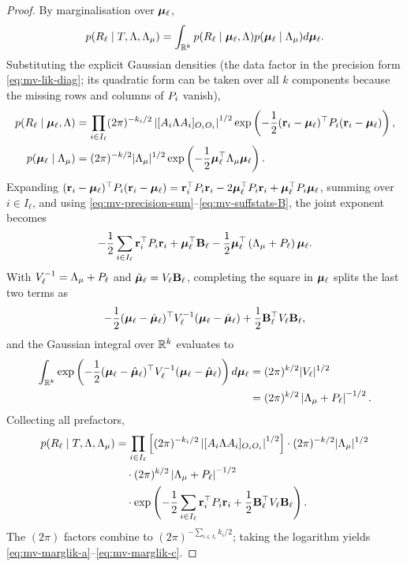 \begin{proof}
	By marginalisation over $\bm{\mu}_\ell$,
	\begin{equation}
		p(R_\ell \mid T, \Lambda, \Lambda_{\mu})
		= \int_{\mathbb{R}^k} p(R_\ell \mid \bm{\mu}_\ell, \Lambda)
		p(\bm{\mu}_\ell \mid \Lambda_{\mu})  d\bm{\mu}_\ell.
	\end{equation}
	Substituting the explicit Gaussian densities (the data factor in the
	precision form \eqref{eq:mv-lik-diag}; its quadratic form can be taken
	over all $k$ components because the missing rows and columns of $P_i$
	vanish),
	\begin{align}
		p(R_\ell \mid \bm{\mu}_\ell, \Lambda)
		 & = \prod_{i \in I_\ell}(2\pi)^{-k_i/2}
		\left|[A_i\Lambda A_i]_{O_iO_i}\right|^{1/2}
		\exp\left(-\frac{1}{2}(\mathbf{r}_i - \bm{\mu}_\ell)^\top P_i(\mathbf{r}_i - \bm{\mu}_\ell)\right), \\
		p(\bm{\mu}_\ell \mid \Lambda_{\mu})
		 & = (2\pi)^{-k/2}|\Lambda_{\mu}|^{1/2}
		\exp\left(-\frac{1}{2}\bm{\mu}_\ell^\top\Lambda_{\mu}\bm{\mu}_\ell\right).
	\end{align}
	Expanding $(\mathbf{r}_i - \bm{\mu}_\ell)^\top P_i(\mathbf{r}_i - \bm{\mu}_\ell)
		= \mathbf{r}_i^\top P_i\mathbf{r}_i - 2\bm{\mu}_\ell^\top P_i\mathbf{r}_i
		+ \bm{\mu}_\ell^\top P_i\bm{\mu}_\ell$, summing over $i \in I_\ell$, and using
	\eqref{eq:mv-precision-sum}--\eqref{eq:mv-suffstats-B}, the joint exponent
	becomes
	\begin{equation}
		-\frac{1}{2}\sum_{i\in I_\ell}\mathbf{r}_i^\top P_i\mathbf{r}_i
		+ \bm{\mu}_\ell^\top\mathbf{B}_\ell
		- \frac{1}{2}\bm{\mu}_\ell^\top\left(\Lambda_{\mu} + P_\ell\right)\bm{\mu}_\ell.
	\end{equation}
	With $V_\ell^{-1} = \Lambda_{\mu} + P_\ell$ and
	$\hat{\bm{\mu}}_\ell = V_\ell\mathbf{B}_\ell$, completing the square in $\bm{\mu}_\ell$
	splits the last two terms as
	\begin{equation}
		-\frac{1}{2}(\bm{\mu}_\ell - \hat{\bm{\mu}}_\ell)^\top V_\ell^{-1}
		(\bm{\mu}_\ell - \hat{\bm{\mu}}_\ell) + \frac{1}{2}\mathbf{B}_\ell^\top V_\ell\mathbf{B}_\ell,
	\end{equation}
	and the Gaussian integral over $\mathbb{R}^k$ evaluates to
	\begin{align}
		\int_{\mathbb{R}^k}\exp\left(-\frac{1}{2}(\bm{\mu}_\ell - \hat{\bm{\mu}}_\ell)^\top
		V_\ell^{-1}(\bm{\mu}_\ell - \hat{\bm{\mu}}_\ell)\right) d\bm{\mu}_\ell
		 & = (2\pi)^{k/2}|V_\ell|^{1/2}                        \\
		 & = (2\pi)^{k/2}\left|\Lambda_{\mu} + P_\ell\right|^{-1/2}.
	\end{align}
	Collecting all prefactors,
	\begin{align}
		p(R_\ell \mid T, \Lambda, \Lambda_{\mu})
		 & = \prod_{i\in I_\ell}\left[(2\pi)^{-k_i/2}
		\left|[A_i\Lambda A_i]_{O_iO_i}\right|^{1/2}\right]
		\cdot (2\pi)^{-k/2}|\Lambda_{\mu}|^{1/2}                                           \\
		 & \quad \cdot (2\pi)^{k/2} \left|\Lambda_{\mu} + P_\ell\right|^{-1/2}           \\
		 & \quad \cdot \exp\left(-\frac{1}{2}\sum_{i\in I_\ell}
		\mathbf{r}_i^\top P_i\mathbf{r}_i + \frac{1}{2}\mathbf{B}_\ell^\top V_\ell\mathbf{B}_\ell\right).
	\end{align}
	The $(2\pi)$ factors combine to $(2\pi)^{-\sum_{i\in I_\ell}k_i/2}$;
	taking the logarithm yields
	\eqref{eq:mv-marglik-a}--\eqref{eq:mv-marglik-c}.
\end{proof}

